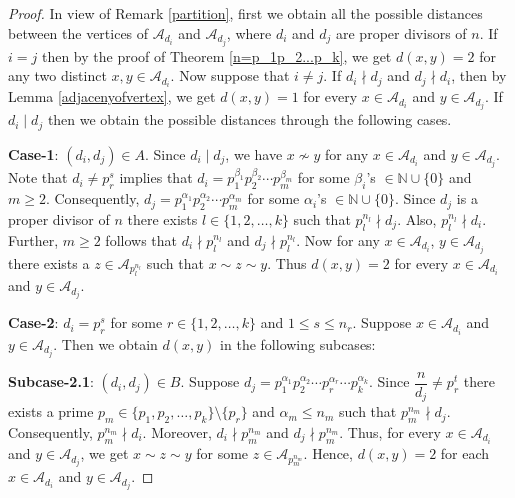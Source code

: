 \documentclass{amsart}
\theoremstyle{plain}
\theoremstyle{definition}
\theoremstyle{remark}
\begin{document}
\begin{proof}
In view of Remark \ref{partition}, first we obtain all the possible distances between the vertices of $\mathcal{A}_{d_i}$ and $\mathcal{A}_{d_j}$, where $d_i$ and $d_j$ are proper divisors of $n$. If $i=j$ then by the proof of Theorem \ref{n=p_1p_2...p_k}, we get $d(x,y)=2$ for any two distinct $x,y \in \mathcal{A}_{d_i}$. Now suppose that $i \neq j$. If $d_i \nmid d_j$ and $d_j \nmid d_i$, then by Lemma \ref{adjacenyofvertex}, we get $d(x,y)=1$ for every $x \in \mathcal{A}_{d_i}$ and $y \in \mathcal{A}_{d_j}$. If $d_i \mid d_j$ then we obtain the possible distances through the following cases.

\textbf{Case-1}: $(d_i, d_j) \in A$. Since $d_i \mid d_j$, we have $x \nsim y$ for any $x \in \mathcal{A}_{d_i}$ and $y \in \mathcal{A}_{d_j}$. Note that $d_i \neq p_r^s$ implies that $d_i = p_1^{\beta_1}p_2^{\beta_2} \cdots p_m^{\beta_m}$ for some $\beta_i$'s $\in \mathbb{N} \cup \{ 0 \}$ and $m \geq 2$. Consequently, $d_j = p_1^{\alpha_1}p_2^{\alpha_2} \cdots p_m^{\alpha_m}$ for some $\alpha_i$'s $\in \mathbb{N} \cup \{ 0 \}$. Since $d_j$ is a proper divisor of $n$ there exists $l \in \{1, 2, \ldots, k\}$ such that $p_l^{n_l} \nmid d_j$. Also, $p_l^{n_l} \nmid d_i$. Further, $m \geq 2$ follows that $d_i \nmid p_l^{n_l}$ and $d_j \nmid p_l^{n_l}$. Now for any $x \in \mathcal{A}_{d_i}$, $y \in \mathcal{A}_{d_j}$ there exists a $z \in \mathcal{A}_{p_l^{n_l}}$ such that $x \sim z \sim y$. Thus $d(x,y)=2$ for every $x \in \mathcal{A}_{d_i}$ and $y \in \mathcal{A}_{d_j}$. 

\textbf{Case-2}: $d_i = p_r^s$ for some $r \in \{ 1,2, \ldots ,k \}$ and $1 \leq s \leq n_r$. Suppose $x\in \mathcal{A}_{d_i}$ and $y \in \mathcal{A}_{d_j}$. Then we obtain $d(x,y)$ in the following subcases: 

\hspace{.5cm}\textbf{Subcase-2.1}: $(d_i, d_j) \in B$. Suppose $d_j = p_1^{\alpha_1}p_2^{\alpha_2} \cdots p_r^{\alpha_r} \cdots p_k^{\alpha_k}$. Since $\dfrac{n}{d_j} \neq p_r^t$ there exists a prime $p_m \in \{ p_1, p_2, \ldots, p_k \} \setminus \{p_r\}$ and $\alpha_m \leq n_m$ such that $p_m^{n_m} \nmid d_j$. Consequently, $p_m^{n_m} \nmid d_i$. Moreover, $d_i \nmid p_m^{n_m}$ and $ d_j \nmid p_m^{n_m}$. Thus, for every $x \in \mathcal{A}_{d_i}$ and $y \in \mathcal{A}_{d_j}$, we get $x \sim z \sim y$ for some $z \in \mathcal{A}_{p_m^{n_m}}$. Hence, $d(x,y) =2$ for each $x \in \mathcal{A}_{d_i}$ and $y \in \mathcal{A}_{d_j}$. 


\end{proof}
\end{document}
